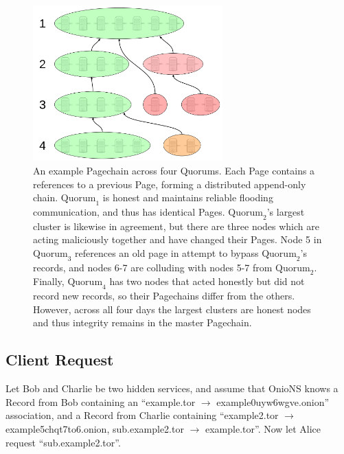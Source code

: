 \begin{figure}[htbp]
	\centering
	\includegraphics[width=0.65\textwidth]{images/LucidCharts/Page-chain.png}
	\caption{An example Pagechain across four Quorums. Each Page contains a references to a previous Page, forming a distributed append-only chain. $ \mathrm{Quorum}_{1} $ is honest and maintains reliable flooding communication, and thus has identical Pages. $ \mathrm{Quorum}_{2} $'s largest cluster is likewise in agreement, but there are three nodes which are acting maliciously together and have changed their Pages. Node 5 in $ \mathrm{Quorum}_{3} $ references an old page in attempt to bypass $ \mathrm{Quorum}_{2} $'s records, and nodes 6-7 are colluding with nodes 5-7 from $ \mathrm{Quorum}_{2} $. Finally, $ \mathrm{Quorum}_{4} $ has two nodes that acted honestly but did not record new records, so their Pagechains differ from the others. However, across all four days the largest clusters are honest nodes and thus integrity remains in the master Pagechain.}
	\label{fig:sidechains}
\end{figure}

\subsection{Client Request}


Let Bob and Charlie be two hidden services, and assume that OnioNS knows a Record from Bob containing an ``example.tor $ \rightarrow $ example0uyw6wgve.onion'' association, and a Record from Charlie containing ``example2.tor $ \rightarrow $ example5chqt7to6.onion, sub.example2.tor $ \rightarrow $ example.tor''. Now let Alice request ``sub.example2.tor''.

